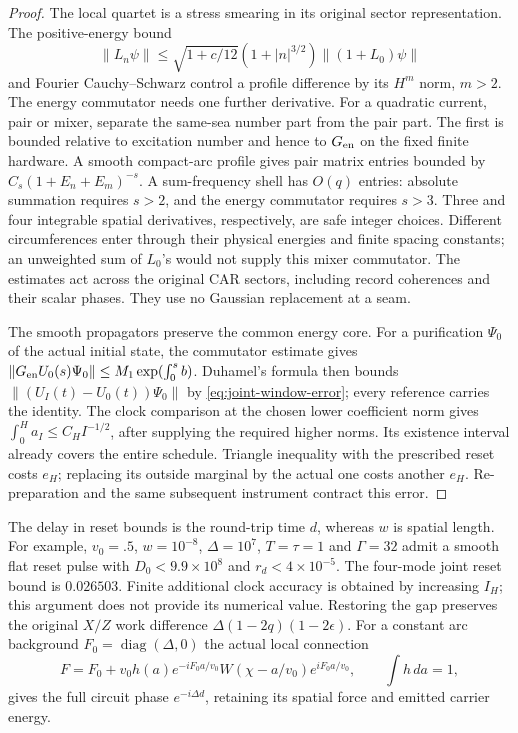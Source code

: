 \begin{proof}
The local quartet is a stress smearing in its original sector
representation. The positive-energy bound
\cite[Sections~2.2--2.3]{CarpiTanimotoWeiner2022}
\[
 \|L_n\psi\|\le\sqrt{1+c/12}(1+|n|^{3/2})
                         \|(1+L_0)\psi\|
\]
and Fourier Cauchy--Schwarz control a profile difference by its
$H^m$ norm, $m>2$. The energy commutator needs one further derivative.
For a quadratic current, pair or mixer, separate the same-sea number
part from the pair part. The first is bounded relative to excitation
number and hence to $G_{\rm en}$ on the fixed finite hardware. A
smooth compact-arc profile gives pair matrix entries bounded by
$C_s(1+E_n+E_m)^{-s}$. A sum-frequency shell has $O(q)$ entries:
absolute summation requires $s>2$, and the energy commutator requires
$s>3$. Three and four integrable spatial derivatives, respectively,
are safe integer choices. Different circumferences enter through
their physical energies and finite spacing constants; an unweighted
sum of $L_0$'s would not supply this mixer commutator. The estimates
act across the original CAR sectors, including record coherences and
their scalar phases. They use no Gaussian replacement at a seam.

The smooth propagators preserve the common energy core. For a
purification $\Psi_0$ of the actual initial state, the commutator
estimate gives
$\|G_{\rm en}U_0(s)\Psi_0\|\le M_1\exp(\int_0^s b)$.
Duhamel's formula then bounds
$\|(U_I(t)-U_0(t))\Psi_0\|$ by \eqref{eq:joint-window-error};
every reference carries the identity. The clock comparison at the
chosen lower coefficient norm gives
$\int_0^H a_I\le C_H I^{-1/2}$, after supplying the required higher
norms. Its existence interval already covers the entire schedule.
Triangle inequality with the prescribed reset costs $e_H$; replacing
its outside marginal by the actual one costs another $e_H$.
Re-preparation and the same subsequent instrument contract this error.
\end{proof}

The delay in reset bounds is the round-trip time $d$, whereas $w$
is spatial length. For example, $v_0=.5$, $w=10^{-8}$,
$\Delta=10^7$, $T=\tau=1$ and $\Gamma=32$ admit a smooth
flat reset pulse with $D_0<9.9\times10^8$ and
$r_d<4\times10^{-5}$. The four-mode joint reset bound is
$0.026503$. Finite additional clock accuracy is obtained by
increasing $I_H$; this argument does not provide its numerical value.
Restoring the gap preserves the original $X/Z$ work difference
$\Delta(1-2q)(1-2\epsilon)$. For a constant arc background
$F_0=\operatorname{diag}(\Delta,0)$ the actual local connection
\[
 F=F_0+v_0h(a)e^{-iF_0a/v_0}
                 W(\chi-a/v_0)e^{iF_0a/v_0},\qquad \int h\,da=1,
\]
gives the full circuit phase $e^{-i\Delta d}$, retaining its
spatial force and emitted carrier energy.

